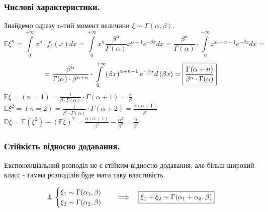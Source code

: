 \subsubsection{Числові характеристики.}
Знайдемо одразу n-тий момент величини $ \xi \sim \Gamma(\alpha, \beta)$.
$$
\mathbb{E} \xi^n \!=\!  \!\int\limits_{0}^{ +\infty}{ x^n \cdot f_{\xi} (x) dx} \!=\! \int\limits_{0}^{ +\infty}{x^n  \frac{\beta^{\alpha}}{\Gamma(\alpha)} x^{\alpha-1}e^{-\beta x}}dx\!=\! \frac{\beta^{\alpha}}{\Gamma(\alpha)} \cdot   \int\limits_{0}^{ +\infty}{ x^{\alpha+n-1}e^{-\beta x}}dx \!=
$$
$$
=  \frac{\beta^{\alpha}}{\Gamma(\alpha) \cdot \beta^{n + \alpha}} \cdot   \int\limits_{0}^{ +\infty}{ \left( \beta x \right) ^{\alpha+n-1}e^{-\beta x}} d \left( \beta x \right)  = \fbox{$ \dfrac{\Gamma(\alpha + n)}{ \beta^n \cdot \Gamma(\alpha)}$}
$$
$
\mathbb{E} \xi = (n = 1 ) = \frac{1}{ \beta \cdot \Gamma (\alpha)} \cdot \Gamma(\alpha+1) = \frac{\alpha}{\beta}
$\\
$
\mathbb{E} \xi^2 = (n = 2) = \frac{1}{\beta^2 \cdot \Gamma (\alpha) }  \cdot \Gamma(\alpha + 2) = \frac{\alpha ( \alpha + 1)}{\beta^2}
$\\
$
\mathbb{D} \xi = \mathbb{E}(\xi^2) - \left( \mathbb{E}\xi \right) ^2 = \frac{\alpha ( \alpha + 1)}{\beta^2} - \frac{\alpha^2}{\beta^2} = \frac{\alpha}{\beta^2}
$
\subsubsection{Стійкість відносно додавання.}

Експоненціальний розподіл не є стійким відносно додавання, але більш широкий класс - гамма розподілів буде мати таку властивість.
\begin{boxteo}
$$
 \independent \begin{cases}
  \xi_1 \sim \Gamma (\alpha_1, \beta)\\
  \xi_2 \sim \Gamma (\alpha_2, \beta)
\end{cases} \quad \Longrightarrow \quad \fbox{$ \xi_1 + \xi_2 \sim \Gamma(\alpha_1 + \alpha_2 , \beta)$}
$$
\end{boxteo}

